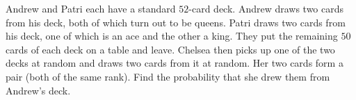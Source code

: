 Andrew and Patri each have a standard $52$-card deck. Andrew draws two cards from his deck, both of which turn out to be queens. Patri draws two cards from his deck, one of which is an ace and the other a king. They put the remaining $50$ cards of each deck on a table and leave. Chelsea then picks up one of the two decks at random and draws two cards from it at random. Her two cards form a pair (both of the same rank). Find the probability that she drew them from Andrew's deck.
